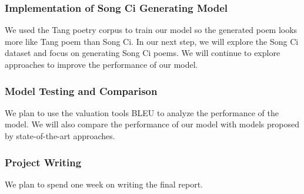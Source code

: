 \subsubsection{Implementation of Song Ci Generating Model }
We used the Tang poetry corpus to train our model so the generated poem looks more like Tang poem than Song Ci. 
%
In our next step, we will explore the Song Ci dataset and focus on generating Song Ci poems.
%
We will continue to explore approaches to improve the performance of our model.

\subsubsection{Model Testing and Comparison}
We plan to use the valuation tools BLEU \cite{papineni2002bleu} to analyze the performance of the model. We will also compare the performance of our model with models proposed by state-of-the-art approaches.

\subsubsection{Project Writing} We plan to spend one week on writing  the final report.



